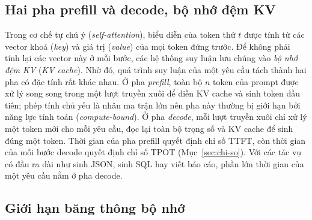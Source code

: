 \subsection{Hai pha prefill và decode, bộ nhớ đệm KV}

Trong cơ chế tự chú ý (\textit{self-attention}), biểu diễn của token thứ $t$ được tính từ các vector khoá (\textit{key}) và giá trị (\textit{value}) của mọi token đứng trước. Để không phải tính lại các vector này ở mỗi bước, các hệ thống suy luận lưu chúng vào \textit{bộ nhớ đệm KV} (\textit{KV cache}). Nhờ đó, quá trình suy luận của một yêu cầu tách thành hai pha có đặc tính rất khác nhau. Ở pha \textit{prefill}, toàn bộ $n$ token của prompt được xử lý song song trong một lượt truyền xuôi để điền KV cache và sinh token đầu tiên; phép tính chủ yếu là nhân ma trận lớn nên pha này thường bị giới hạn bởi năng lực tính toán (\textit{compute-bound}). Ở pha \textit{decode}, mỗi lượt truyền xuôi chỉ xử lý một token mới cho mỗi yêu cầu, đọc lại toàn bộ trọng số và KV cache để sinh đúng một token. Thời gian của pha prefill quyết định chỉ số TTFT, còn thời gian của mỗi bước decode quyết định chỉ số TPOT (Mục~\ref{sec:chi-so}). Với các tác vụ có đầu ra dài như sinh JSON, sinh SQL hay viết báo cáo, phần lớn thời gian của một yêu cầu nằm ở pha decode.

\subsection{Giới hạn băng thông bộ nhớ}
\label{subsec:bang-thong}

